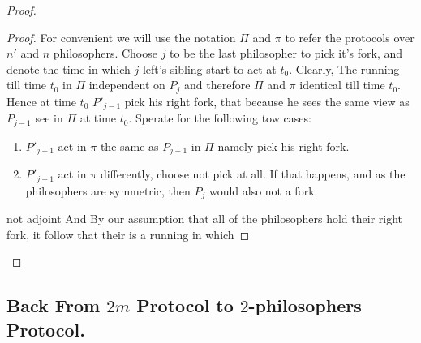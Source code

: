 \documentclass[manuscript,screen,review]{acmart}
\begin{document}
\begin{proof}
  \begin{proof}
    For convenient we will use the notation $\Pi$ and $\pi$ to refer the protocols over $n'$ and $n$ philosophers. Choose $j$ to be the last philosopher to pick it's fork, and denote the time in which $j$ left's sibling start to act at $t_{0}$. Clearly, The running till time $t_{0}$ in $\Pi$  independent on $P_{j}$ and therefore $\Pi$ and $\pi$ identical till time $t_{0}$. Hence at time $t_{0}$ $P'_{j-1}$ pick his right fork, that because he sees the same view as $P_{j-1}$ see in $\Pi$ at time $t_{0}$. Sperate for the following tow cases: 
    \begin{enumerate}
      \item $P'_{j+1}$ act in $\pi$ the same as $P_{j+1}$ in $\Pi$ namely pick his right fork.  
      \item $P'_{j+1}$ act in $\pi$ differently, choose not pick at all. If that happens, and as the philosophers are symmetric, then $P_{j}$ would also not a fork.    
    \end{enumerate}
    not adjoint  And By our assumption that all of the philosophers hold their right fork, it follow that their is a running in which 
  \end{proof}

\end{proof}

\subsection{ Back From $2m$ Protocol to $2$-philosophers Protocol.}
\end{document}
